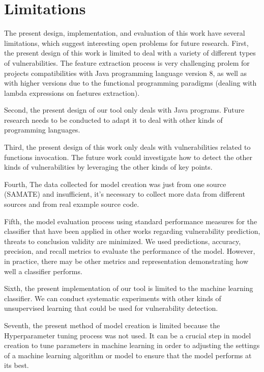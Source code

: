 

\section{Limitations} %
\label{sec:LIMITATIONS_SEC}

The present design, implementation, and evaluation of this work have several limitations, which suggest interesting open problems for future research.  First, the present design of this work is limited to deal with a variety of different types of vulnerabilities. The feature extraction process is very challenging prolem for projects compatibilities with Java programming language version 8, as well as with higher versions due to the functional programming paradigms (dealing with lambda expressions on faetures extraction).

Second, the present design of our tool only deals with Java programs. Future research needs to be conducted to adapt it to deal with other kinds of programming languages.

Third, the present design of this work only deals with vulnerabilities related to functions invocation. The future work could investigate how to detect the other kinds of vulnerabilities by leveraging the other kinds of key points.

Fourth, The data collected for model creation was just from one source (SAMATE) and  insufficient, it's necessary to collect more data from different sources and from real example source code.

Fifth, the model evaluation process using standard performance measures for the classifier that have been applied in other works regarding vulnerability prediction, threats to conclusion validity are minimized.  We used  predictions, accuracy, precision, and recall metrics to evaluate the performance of the model. However, in practice, there may be other metrics and representation demonstrating how well a classifier performs.

Sixth, the present implementation of our tool is limited to the machine learning classifier. We can conduct systematic experiments with other kinds of 
unsupervised learning that could be used for vulnerability detection.

Seventh, the present  method of model creation is limited because the Hyperparameter tuning process was not used. It can be a crucial step in model creation to tune parameters in machine learning in order to adjusting the settings of a machine learning algorithm or model to ensure that the model performs at its best.

